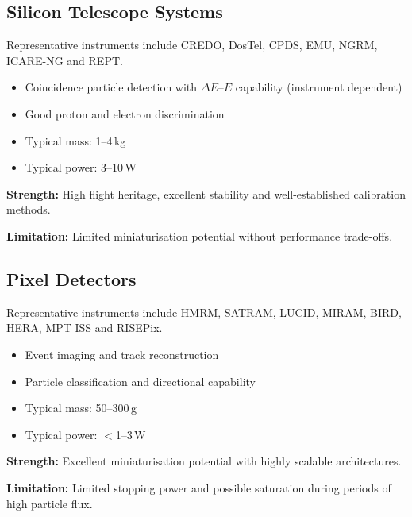 
\subsection{Silicon Telescope Systems}

Representative instruments include CREDO, DosTel, CPDS, EMU, NGRM, ICARE-NG and REPT.

\begin{itemize}[noitemsep]
\item Coincidence particle detection with $\Delta E$--$E$ capability (instrument dependent)
\item Good proton and electron discrimination
\item Typical mass: 1--4\,kg
\item Typical power: 3--10\,W
\end{itemize}

\textbf{Strength:} High flight heritage, excellent stability and well-established calibration methods.

\textbf{Limitation:} Limited miniaturisation potential without performance trade-offs.


\subsection{Pixel Detectors}

Representative instruments include HMRM, SATRAM, LUCID, MIRAM, BIRD, HERA, MPT ISS and RISEPix.

\begin{itemize}[noitemsep]
\item Event imaging and track reconstruction
\item Particle classification and directional capability
\item Typical mass: 50--300\,g
\item Typical power: $<$1--3\,W
\end{itemize}

\textbf{Strength:} Excellent miniaturisation potential with highly scalable architectures.

\textbf{Limitation:} Limited stopping power and possible saturation during periods of high particle flux.


